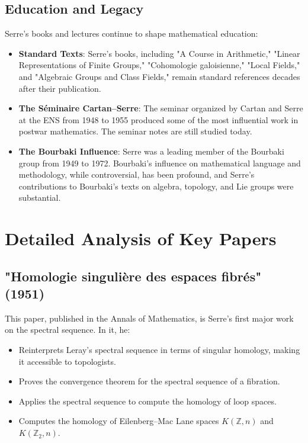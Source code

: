 \subsection{Education and Legacy}

Serre's books and lectures continue to shape mathematical education:

\begin{itemize}
\item \textbf{Standard Texts}: Serre's books, including "A Course in Arithmetic," "Linear Representations of Finite Groups," "Cohomologie galoisienne," "Local Fields," and "Algebraic Groups and Class Fields," remain standard references decades after their publication.

\item \textbf{The Séminaire Cartan--Serre}: The seminar organized by Cartan and Serre at the ENS from 1948 to 1955 produced some of the most influential work in postwar mathematics. The seminar notes are still studied today.

\item \textbf{The Bourbaki Influence}: Serre was a leading member of the Bourbaki group from 1949 to 1972. Bourbaki's influence on mathematical language and methodology, while controversial, has been profound, and Serre's contributions to Bourbaki's texts on algebra, topology, and Lie groups were substantial.
\end{itemize}

\section{Detailed Analysis of Key Papers}

\subsection{"Homologie singulière des espaces fibrés" (1951)}

This paper, published in the Annals of Mathematics, is Serre's first major work on the spectral sequence. In it, he:
\begin{itemize}
\item Reinterprets Leray's spectral sequence in terms of singular homology, making it accessible to topologists.
\item Proves the convergence theorem for the spectral sequence of a fibration.
\item Applies the spectral sequence to compute the homology of loop spaces.
\item Computes the homology of Eilenberg--Mac Lane spaces $K(\mathbb{Z}, n)$ and $K(\mathbb{Z}_2, n)$.
\end{itemize}

